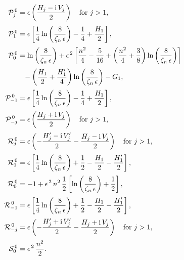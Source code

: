 \documentclass[12pt,prb,aps]{revtex4-1}
\begin{document}
\begin{align}
{\cal P}_j^{\,0} &= \epsilon\left(\frac{H_j-{\rm i}\,V_j}{2}\right)\mbox{~~~for $j>1$},\\[0.5ex]
{\cal P}_1^{\,0} &=\epsilon\left[\frac{1}{4}\ln\left(\frac{8}{\zeta_n\,\epsilon}\right)-\frac{1}{4}+\frac{H_1}{2}\right],\\[0.5ex]
{\cal P}_0^{\,0}  &= \ln\left(\frac{8}{\zeta_n\,\epsilon}\right)+\epsilon^{\,2}\left[\frac{n^2}{4} -\frac{5}{16} + \left(\frac{n^2}{4}+\frac{3}{8}\right)\ln\left(\frac{8}{\zeta_n\,\epsilon}\right)\right]\nonumber\\[0.5ex]
&\phantom{=}-\left(\frac{H_1}{2}+\frac{H_1'}{4}\right)\ln\left(\frac{8}{\zeta_n\,\epsilon}\right)-G_1,\\[0.5ex]
{\cal P}_{-1}^{\,0} &=\epsilon\left[\frac{1}{4}\ln\left(\frac{8}{\zeta_n\,\epsilon}\right)-\frac{1}{4}+\frac{H_1}{2}\right],\\[0.5ex]
{\cal P}_{-j}^{\,0}   &= \epsilon\left(\frac{H_j+{\rm i}\,V_j}{2}\right)\mbox{~~~for $j>1$},\\[0.5ex]
{\cal R}_j^{\,0}&= \epsilon\left(-\frac{H_j'-{\rm i}\,V_j'}{2}-\frac{H_j-{\rm i}\,V_j}{2}\right)\mbox{~~~for $j>1$},\\[0.5ex]
{\cal R}_1^{\,0} &=\epsilon\left[\frac{1}{4}\ln\left(\frac{8}{\zeta_n\,\epsilon}\right)+\frac{1}{2}-\frac{H_1}{2}-\frac{H_1'}{2}\right],\\[0.5ex]
{\cal R}_0^{\,0}  &= -1+\epsilon^{\,2}\,n^2\,\frac{1}{2}\left[\ln\left(\frac{8}{\zeta_n\,\epsilon}\right)+\frac{1}{2}\right],\\[0.5ex]
{\cal R}_{-1}^{\,0} &=\epsilon\left[\frac{1}{4}\ln\left(\frac{8}{\zeta_n\,\epsilon}\right)+\frac{1}{2}-\frac{H_1}{2}-\frac{H_1'}{2}\right],\\[0.5ex]
{\cal R}_{-j}^{\,0}   &= \epsilon\left(-\frac{H_j'+{\rm i}\,V_j'}{2}-\frac{H_j+{\rm i}\,V_j}{2}\right)\mbox{~~~for $j>1$},\\[0.5ex]
{\cal S}_0^{\,0} &= \epsilon^{\,2}\,\frac{n^2}{2}.
\end{align}
\end{document}

